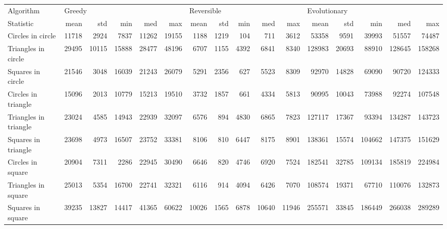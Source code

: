 \begin{tabular}{lrrrrrrrrrrrrrrr}
\toprule
Algorithm & \multicolumn{5}{l}{Greedy} & \multicolumn{5}{l}{Reversible} & \multicolumn{5}{l}{Evolutionary} \\
Statistic &   mean &    std &    min &    med &    max &       mean &   std &   min &    med &    max &         mean &    std &     min &     med &     max \\
\midrule
Circles in circle     &  11718 &   2924 &   7837 &  11262 &  19155 &       1188 &  1219 &   104 &    711 &   3612 &        53358 &   9591 &   39993 &   51557 &   74487 \\
Triangles in circle   &  29495 &  10115 &  15888 &  28477 &  48196 &       6707 &  1155 &  4392 &   6841 &   8340 &       128983 &  20693 &   88910 &  128645 &  158268 \\
Squares in circle     &  21546 &   3048 &  16039 &  21243 &  26079 &       5291 &  2356 &   627 &   5523 &   8309 &        92970 &  14828 &   69090 &   90720 &  124333 \\
Circles in triangle   &  15096 &   2013 &  10779 &  15213 &  19510 &       3732 &  1857 &   661 &   4334 &   5813 &        90995 &  10043 &   73988 &   92274 &  107548 \\
Triangles in triangle &  23024 &   4585 &  14943 &  22939 &  32097 &       6576 &   894 &  4830 &   6865 &   7823 &       127117 &  17367 &   93394 &  134287 &  143723 \\
Squares in triangle   &  23698 &   4973 &  16507 &  23752 &  33381 &       8106 &   810 &  6447 &   8175 &   8901 &       138361 &  15574 &  104662 &  147375 &  151629 \\
Circles in square     &  20904 &   7311 &   2286 &  22945 &  30490 &       6646 &   820 &  4746 &   6920 &   7524 &       182541 &  32785 &  109134 &  185819 &  224984 \\
Triangles in square   &  25013 &   5354 &  16700 &  22741 &  32321 &       6116 &   914 &  4094 &   6426 &   7070 &       108574 &  19371 &   67710 &  110076 &  132873 \\
Squares in square     &  39235 &  13827 &  14417 &  41365 &  60622 &      10026 &  1565 &  6878 &  10640 &  11946 &       255571 &  33845 &  186449 &  266038 &  289289 \\
\bottomrule
\end{tabular}
